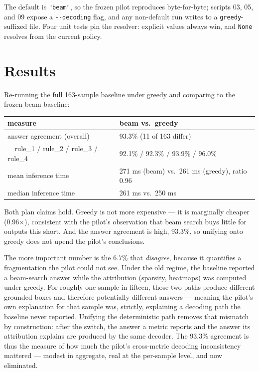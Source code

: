The default is \texttt{"beam"}, so the frozen pilot reproduces byte-for-byte; scripts 03, 05, and 09
expose a \texttt{-{}-decoding} flag, and any non-default run writes to a \texttt{greedy}-suffixed file.
Four unit tests pin the resolver: explicit values always win, and \texttt{None} resolves from the
current policy.

\section{Results}

Re-running the full 163-sample baseline under greedy and comparing to the frozen beam baseline:

\begin{center}
\begin{tabular}{p{5.8cm}p{4.0cm}}
\toprule
\textbf{measure} & \textbf{beam vs.\ greedy} \\
\midrule
answer agreement (overall)      & 93.3\% (11 of 163 differ) \\
\ \ rule\_1 / rule\_2 / rule\_3 / rule\_4 & 92.1\% / 92.3\% / 93.9\% / 96.0\% \\
mean inference time             & 271 ms (beam) vs.\ 261 ms (greedy), ratio 0.96 \\
median inference time           & 261 ms vs.\ 250 ms \\
\bottomrule
\end{tabular}
\label{tab:p16-agree}
\end{center}

Both plan claims hold. Greedy is not more expensive --- it is marginally cheaper (0.96$\times$),
consistent with the pilot's observation that beam search buys little for outputs this short. And the
answer agreement is high, 93.3\%, so unifying onto greedy does not upend the pilot's conclusions.

The more important number is the 6.7\% that \emph{disagree}, because it quantifies a fragmentation the
pilot could not see. Under the old regime, the baseline reported a beam-search answer while the
attribution (sparsity, heatmaps) was computed under greedy. For roughly one sample in fifteen, those
two paths produce different grounded boxes and therefore potentially different answers --- meaning the
pilot's own explanation for that sample was, strictly, explaining a decoding path the baseline never
reported. Unifying the deterministic path removes that mismatch by construction: after the switch, the
answer a metric reports and the answer its attribution explains are produced by the same decoder. The
93.3\% agreement is thus the measure of how much the pilot's cross-metric decoding inconsistency
mattered --- modest in aggregate, real at the per-sample level, and now eliminated.


